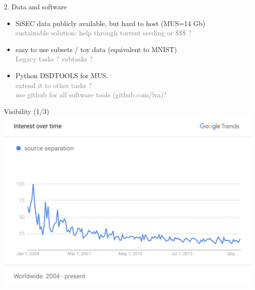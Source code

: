 \documentclass{beamer}
\begin{document}
\begin{frame}[fragile]{2. Data and software}

\begin{itemize}
\item SiSEC data publicly available, but hard to host (MUS=14 Gb)\\
\textcolor{gray}{sustainable solution: help through torrent seeding or \$\$\$ ?}
\item easy to use subsets / toy data (equivalent to MNIST)\\
\textcolor{gray}{Legacy tasks ? subtasks ?}
\item Python DSDTOOLS for MUS. \\ \textcolor{gray}{extend it to other tasks ?}
\\ \textcolor{gray}{use github for all software tools (github.com/lva)?}
\end{itemize}
\end{frame}



\begin{frame}{Visibility (1/3)}
\includegraphics[width=\textwidth]{fig/source_separation.png}
\end{frame}
\end{document}
